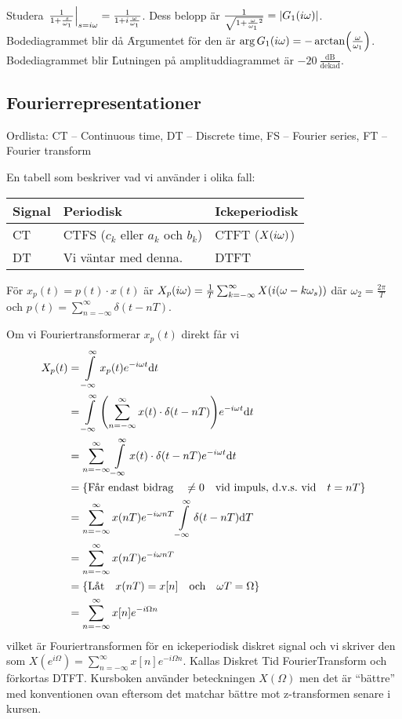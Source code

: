 \documentclass[a4paper]{article}
\begin{document}
Studera \(
    \eval{\frac{1}{1 + \frac{s}{\omega_1}}}_{s=\io} = \frac{1}{1+ i \frac{\omega}{\omega_1} } 
\). Dess belopp är \(
    \frac{1}{\sqrt{1 + \frac{\omega}{\omega_1}^2}} = \abs{G_1(i\omega)}
\). Bodediagrammet blir då \f

Argumentet för den är \(
    \arg{G_1(i\omega)} = - \arctan(\frac{\omega}{\omega_1} )
\). Bodediagrammet blir \f

Lutningen på amplituddiagrammet är \(
    -20~\frac{\si{\deci\bel}}{\text{dekad}} 
\).

\subsection{Fourierrepresentationer}
Ordlista: CT -- Continuous time, DT -- Discrete time, FS -- Fourier series, 
FT -- Fourier transform

En tabell som beskriver vad vi använder i olika fall: 

\begin{tabular}{lll}
    Signal & Periodisk                                & Ickeperiodisk     \\ \hline
    CT     & CTFS (\(c_k\) eller \(a_k\) och \(b_k\)) & CTFT (\(X(i\omega)\)) \\
    DT     & Vi väntar med denna.                     & DTFT             
\end{tabular}

\begin{påm}
    För \(
        x_p(t) = p(t) \cdot x(t) 
    \) är \(
        X_p(i\omega) = \frac{1}{T} \sum_{k=-\infty}^\infty X(i(\omega-k\omega_s))
    \) där \(
        \omega_2 = \frac{2\pi}{T} 
    \) och \(
        p(t) = \sum_{n=-\infty}^\infty \delta(t-nT)
    \).
\end{påm}

Om vi Fouriertransformerar \(
    x_p(t)
\) direkt får vi 
\begin{align*}
    X_p(t) &= \infint x_p(t) e^{-\io t} \dd t \\
           &= \infint \qty( \sum_{n=-\infty}^\infty x(t) \cdot \delta(t-nT) ) e^{-\io t} \dd t \\
           &= \sum_{n=-\infty}^\infty \infint x(t) \cdot \delta(t-nT) e^{-\io t} \dd t \\
           &= \{\qq*{Får endast bidrag} \neq 0 \qq{vid impuls, d.v.s.\ vid} t = nT\} \\
           &= \sum_{n=-\infty}^\infty x(nT) e^{-\io nT} \infint \delta(t-nT) \dd T \\
           &= \sum_{n=-\infty}^\infty x(nT) e^{-\io nT} \\
           &= \{ \qq*{Låt} x(nT) = x[n] \qq{och} \omega T = \Omega \} \\
           &= \sum_{n=-\infty}^\infty x[n]e^{-i \Omega n}
\end{align*}
vilket är Fouriertransformen för en ickeperiodisk diskret signal och 
vi skriver den som \(
    X(e^{i\Omega }) = \sum_{n=-\infty}^\infty x[n]e^{-i \Omega n}
\). Kallas Diskret Tid FourierTransform och förkortas DTFT. Kursboken använder 
beteckningen \(
    X(\Omega)
\) men det är \enquote{bättre} med konventionen ovan eftersom det matchar 
bättre mot z-transformen senare i kursen.
\end{document}
